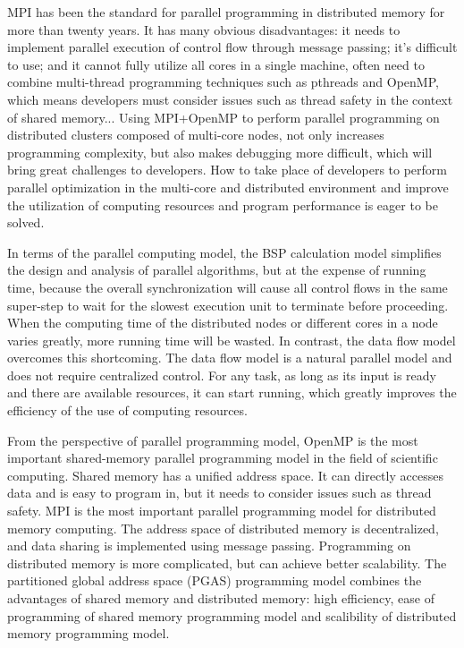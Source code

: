 MPI has been the standard for parallel programming in distributed memory for more than twenty years. It has many obvious disadvantages: it needs to implement parallel execution of control flow through message passing; it's difficult to use; and it cannot fully utilize all cores in a single machine, often need to combine multi-thread programming techniques such as pthreads and OpenMP, which means developers must consider issues such as thread safety in the context of shared memory... Using MPI+OpenMP to perform parallel programming on distributed clusters composed of multi-core nodes, not only increases programming complexity, but also makes debugging more difficult, which will bring great challenges to developers. How to take place of developers to perform parallel optimization in the multi-core and distributed environment and improve the utilization of computing resources and program performance is eager to be solved.

In terms of the parallel computing model, the BSP calculation model simplifies the design and analysis of parallel algorithms, but at the expense of running time, because the overall synchronization will cause all control flows in the same super-step to wait for the slowest execution unit to terminate before proceeding. When the computing time of the distributed nodes or different cores in a node varies greatly, more running time will be wasted. In contrast, the data flow model overcomes this shortcoming. The data flow model is a natural parallel model and does not require centralized control. For any task, as long as its input is ready and there are available resources, it can start running, which greatly improves the efficiency of the use of computing resources.

From the perspective of parallel programming model, OpenMP is the most important shared-memory parallel programming model in the field of scientific computing. Shared memory has a unified address space. It can directly accesses data and is easy to program in, but it needs to consider issues such as thread safety. MPI is the most important parallel programming model for distributed memory computing. The address space of distributed memory is decentralized, and data sharing is implemented using message passing. Programming on distributed memory is more complicated, but can achieve better scalability. The partitioned global address space (PGAS) programming model combines the advantages of shared memory and distributed memory: high efficiency, ease of programming of shared memory programming model and scalibility of distributed memory programming model.

